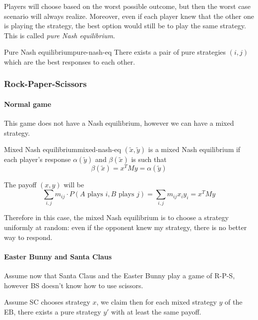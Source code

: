 \documentclass[12pt]{extarticle}
\begin{document}
Players will choose based on the worst possible outcome, but then the worst case scenario will
always realize.
Moreover, even if each player knew that the other one is playing the  strategy,
the best option would still be to play the same strategy.
This is called \emph{pure Nash equilibrium}.

\begin{definition}{Pure Nash equilibrium}{pure-nash-eq}
	There exists a pair of pure strategies $(i, j)$ which are the best responses to each other.
\end{definition}

\subsubsection{Rock-Paper-Scissors}

\paragraph{Normal game}
This game does not have a Nash equilibrium, however we can have a mixed strategy.

\begin{definition}{Mixed Nash equilibrium}{mixed-nash-eq}
	$(\tilde x, \tilde y)$ is a mixed Nash equilibrium if each player's response $\alpha(\tilde y)$
	and $\beta(\tilde x)$ is such that
	\begin{equation}
		\beta(\tilde x) = x^T M y = \alpha(\tilde y)
	\end{equation}
\end{definition}

The payoff $(x, y)$ will be
\begin{equation}
	\sum_{i, j} m_{ij} \cdot P(A \text{ plays } i, B \text{ plays } j)
	= \sum_{i, j} m_{ij} x_i y_i = x^T M y
\end{equation}

Therefore in this case, the mixed Nash equilibrium is to choose a strategy uniformly at random:
even if the opponent knew my strategy, there is no better way to respond.

\paragraph{Easter Bunny and Santa Claus}
Assume now that Santa Claus and the Easter Bunny play a game of R-P-S,
however BS doesn't know how to use scissors.

Assume SC chooses strategy $x$, we claim then for each mixed strategy $y$ of the EB,
there exists a pure strategy $y'$ with at least the same payoff.
\end{document}
